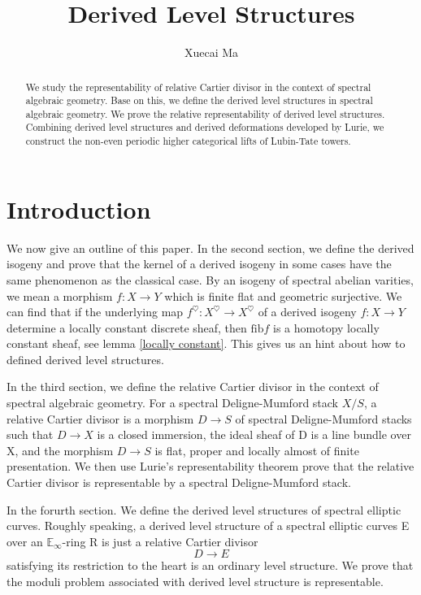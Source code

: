\documentclass[12pt]{article}
\theoremstyle{thry}
\def  \fib      {\mathrm{fib}}
\def  \be       {\mathbb{E}}
\begin{document}
\title{Derived Level Structures}
\author{Xuecai Ma}
\maketitle




\begin{abstract}
We study the representability of relative Cartier divisor  in the context of spectral algebraic geometry. Base on this, we define the derived level structures in spectral algebraic geometry.  We prove the relative representability of derived level structures. Combining derived level structures and derived deformations developed by Lurie, we construct the non-even periodic higher categorical lifts of Lubin-Tate towers.
\end{abstract}

\tableofcontents






\section{Introduction}


We now give an outline of this paper. In the second section, we define the derived isogeny and prove that the  kernel of a derived isogeny in some cases  have the same phenomenon as  the classical case.  By an  isogeny of spectral abelian varities, we mean a morphism $f: X\to Y$ which is finite flat and geometric surjective.  We can find that if the  underlying map $f^{\heartsuit}:  X^{\heartsuit} \to X^{\heartsuit}$ of a derived isogeny $f: X \to Y$ determine a  locally constant discrete sheaf, then  $\fib f$  is a homotopy locally constant sheaf, see lemma \ref{locally constant}. This gives us an hint about how to defined derived level structures.

In the third section, we define the relative Cartier divisor in the context of spectral algebraic geometry. For a spectral Deligne-Mumford stack $X/S$, a relative Cartier divisor is a morphism $D \to S$ of spectral Deligne-Mumford stacks such that $D \to X$ is a closed immersion, the ideal sheaf of D is a line bundle over X, and the morphism $D \to S$ is flat, proper and locally  almost of finite presentation.  We then use Lurie's representability theorem prove that the relative Cartier divisor is representable by a spectral Deligne-Mumford stack.

In the forurth section. We define the derived level structures of spectral elliptic curves. Roughly speaking, a derived level structure of a spectral elliptic curves E over an $\be_{\infty}$-ring R is just a  relative Cartier divisor
$$
D\to E
$$
satisfying its restriction to  the heart is an ordinary level structure. We prove that the moduli problem associated with derived level structure is representable.
\end{document}
